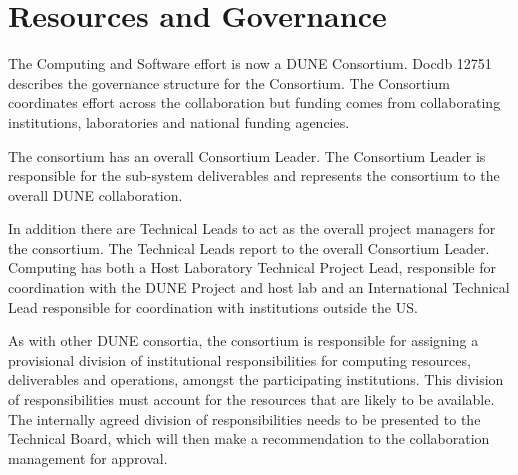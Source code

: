 




\section{Resources and Governance}		
\label{ch:exec-comp-gov}

The Computing and Software effort is now a DUNE Consortium.  Docdb 12751 \cite{bib:docdb12751} describes the governance structure for the Consortium.  The Consortium coordinates effort across the collaboration but funding comes from collaborating institutions, laboratories and national funding agencies. 

The consortium has an overall Consortium Leader. The Consortium Leader is responsible for the sub-system deliverables and represents the consortium to the overall DUNE collaboration.

In addition there  are Technical Leads to act as the overall project managers for the consortium. The Technical Leads report to the overall Consortium Leader.
Computing has both a Host Laboratory Technical Project Lead, responsible for coordination with the DUNE Project and host lab and an International Technical Lead responsible for coordination with institutions outside the US.

As with other DUNE consortia, the consortium is responsible for assigning a provisional division of institutional
responsibilities for computing resources, deliverables and operations, amongst the participating institutions. This division of responsibilities must account for the resources that are likely to be available. The internally agreed division of responsibilities needs to be presented to the Technical Board, which will then make a recommendation to the collaboration management for approval.



